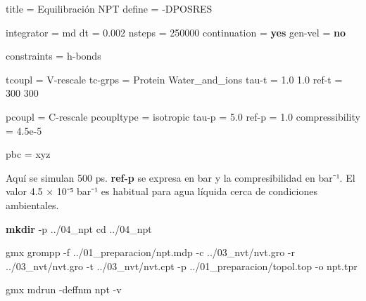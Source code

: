 \documentclass[
  spanish,
  11pt,
  a4paper]{article}
\newenvironment{Shaded}{\begin{snugshade}}{\end{snugshade}}
\newcommand{\AttributeTok}[1]{\textcolor[rgb]{0.13,0.29,0.53}{#1}}
\newcommand{\BuiltInTok}[1]{#1}
\newcommand{\DataTypeTok}[1]{\textcolor[rgb]{0.13,0.29,0.53}{#1}}
\newcommand{\DecValTok}[1]{\textcolor[rgb]{0.00,0.00,0.81}{#1}}
\newcommand{\ExtensionTok}[1]{#1}
\newcommand{\FloatTok}[1]{\textcolor[rgb]{0.00,0.00,0.81}{#1}}
\newcommand{\FunctionTok}[1]{\textcolor[rgb]{0.13,0.29,0.53}{\textbf{#1}}}
\newcommand{\KeywordTok}[1]{\textcolor[rgb]{0.13,0.29,0.53}{\textbf{#1}}}
\newcommand{\NormalTok}[1]{#1}
\newcommand{\OtherTok}[1]{\textcolor[rgb]{0.56,0.35,0.01}{#1}}
\newcommand{\StringTok}[1]{\textcolor[rgb]{0.31,0.60,0.02}{#1}}
\begin{document}
\begin{Shaded}
\begin{Highlighting}[]
\DataTypeTok{title            }\OtherTok{=}\StringTok{ Equilibración NPT}
\DataTypeTok{define           }\OtherTok{=}\StringTok{ {-}DPOSRES}

\DataTypeTok{integrator       }\OtherTok{=}\StringTok{ md}
\DataTypeTok{dt               }\OtherTok{=}\StringTok{ }\FloatTok{0.002}
\DataTypeTok{nsteps           }\OtherTok{=}\StringTok{ }\DecValTok{250000}
\DataTypeTok{continuation     }\OtherTok{=}\StringTok{ }\KeywordTok{yes}
\DataTypeTok{gen{-}vel          }\OtherTok{=}\StringTok{ }\KeywordTok{no}

\DataTypeTok{constraints      }\OtherTok{=}\StringTok{ h{-}bonds}

\DataTypeTok{tcoupl           }\OtherTok{=}\StringTok{ V{-}rescale}
\DataTypeTok{tc{-}grps          }\OtherTok{=}\StringTok{ Protein Water\_and\_ions}
\DataTypeTok{tau{-}t            }\OtherTok{=}\StringTok{ 1.0 1.0}
\DataTypeTok{ref{-}t            }\OtherTok{=}\StringTok{ 300 300}

\DataTypeTok{pcoupl           }\OtherTok{=}\StringTok{ C{-}rescale}
\DataTypeTok{pcoupltype       }\OtherTok{=}\StringTok{ isotropic}
\DataTypeTok{tau{-}p            }\OtherTok{=}\StringTok{ }\FloatTok{5.0}
\DataTypeTok{ref{-}p            }\OtherTok{=}\StringTok{ }\FloatTok{1.0}
\DataTypeTok{compressibility  }\OtherTok{=}\StringTok{ 4.5e{-}5}

\DataTypeTok{pbc              }\OtherTok{=}\StringTok{ xyz}
\end{Highlighting}
\end{Shaded}

Aquí se simulan 500 ps. \textbf{ref-p} se expresa en bar y la
compresibilidad en bar⁻¹. El valor 4.5 × 10⁻⁵ bar⁻¹ es habitual para
agua líquida cerca de condiciones ambientales.

\begin{Shaded}
\begin{Highlighting}[]
\FunctionTok{mkdir} \AttributeTok{{-}p}\NormalTok{ ../04\_npt}
\BuiltInTok{cd}\NormalTok{ ../04\_npt}

\ExtensionTok{gmx}\NormalTok{ grompp     }\AttributeTok{{-}f}\NormalTok{ ../01\_preparacion/npt.mdp     }\AttributeTok{{-}c}\NormalTok{ ../03\_nvt/nvt.gro     }\AttributeTok{{-}r}\NormalTok{ ../03\_nvt/nvt.gro     }\AttributeTok{{-}t}\NormalTok{ ../03\_nvt/nvt.cpt     }\AttributeTok{{-}p}\NormalTok{ ../01\_preparacion/topol.top     }\AttributeTok{{-}o}\NormalTok{ npt.tpr}

\ExtensionTok{gmx}\NormalTok{ mdrun }\AttributeTok{{-}deffnm}\NormalTok{ npt }\AttributeTok{{-}v}
\end{Highlighting}
\end{Shaded}
\end{document}
